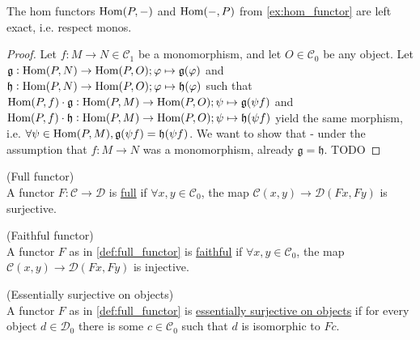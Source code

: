 \begin{lemma}\label{la:hom_functor_left_exact}
The hom functors $\textup{Hom}(P,-)$ and $\textup{Hom}(-,P)$ from \ref{ex:hom_functor} are left exact, i.e. respect monos.
\begin{proof}
Let $f : M \rightarrow N \in \mathcal{C}_{1}$ be a monomorphism, and let $O \in \mathcal{C}_{0}$ be any object.
Let $\mathfrak{g} : \textup{Hom}(P,N) \rightarrow \textup{Hom}(P,O); \varphi \mapsto \mathfrak{g}(\varphi)$
and $\mathfrak{h} : \textup{Hom}(P,N) \rightarrow \textup{Hom}(P,O); \varphi \mapsto \mathfrak{h}(\varphi)$
such that $\textup{Hom}(P,f) \cdot \mathfrak{g} : \textup{Hom}(P,M) \rightarrow \textup{Hom}(P,O); \psi \mapsto \mathfrak{g}(\psi f)$
and  $\textup{Hom}(P,f) \cdot \mathfrak{h} : \textup{Hom}(P,M) \rightarrow \textup{Hom}(P,O); \psi \mapsto \mathfrak{h}(\psi f)$
yield the same morphism, i.e. $\forall \psi \in \textup{Hom}(P,M), \mathfrak{g}(\psi f) = \mathfrak{h}(\psi f)$.
We want to show that - under the assumption that $f : M \rightarrow N$ was a monomorphism, already $\mathfrak{g} = \mathfrak{h}$.
TODO
\end{proof}
\end{lemma}

\begin{definition}{(Full functor)}\label{def:full_functor}\\
A functor $F : \mathcal{C} \rightarrow \mathcal{D}$ is \ul{full} if
$\forall x, y \in \mathcal{C}_{0}$, the map $\mathcal{C}(x, y) \rightarrow \mathcal{D}(Fx, Fy)$ is surjective.
\end{definition}

\begin{definition}{(Faithful functor)}\label{def:faithful_functor}\\
A functor $F$ as in \ref{def:full_functor} is \ul{faithful} if
$\forall x, y \in \mathcal{C}_{0}$, the map $\mathcal{C}(x, y) \rightarrow \mathcal{D}(Fx, Fy)$ is injective.
\end{definition}

\begin{definition}{(Essentially surjective on objects)}\label{def:ess_surj_o_o}\\
A functor $F$ as in \ref{def:full_functor} is \ul{essentially surjective on objects} if for every object $d \in \mathcal{D}_{0}$ there
is some $c \in \mathcal{C}_{0}$ such that $d$ is isomorphic to $Fc$.
\end{definition}

